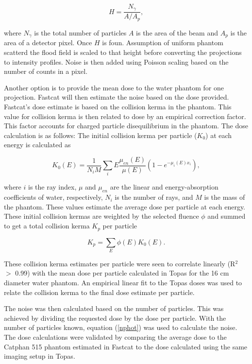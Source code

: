 \begin{equation}
\label{nphot}
    H = \frac{N_\gamma}{A/A_p},
\end{equation}

where $N_\gamma$ is the total number of particles $A$ is the area of the beam and $A_p$ is the area of a detector pixel. Once $H$ is foun.  Assumption of uniform phantom scatterd the flood field is scaled to that height before converting the projections to intensity profiles. Noise is then added using Poisson scaling based on the number of counts in a pixel.  

Another option is to provide the mean dose to the water phantom for one projection. Fastcat will then estimate the noise based on the dose provided. Fastcat's dose estimate is based on the collision kerma in the phantom. This value for collision kerma is then related to dose by an empirical correction factor. This factor accounts for charged particle disequilibrium in the phantom. The dose calculation is as follows: The initial collision kerma per particle ($K_0$) at each energy is calculated as

\begin{equation}
    K_0(E) = \frac{1}{N_i M}\sum\limits_i E \frac{\mu_{en}(E)}{\mu(E)} (1 - e^{-\mu_i(E) x_i}),
\end{equation}

\noindent where $i$ is the ray index, $\mu$ and $\mu_{en}$ are the linear and energy-absorption coefficients of water, respectively, $N_i$ is the number of rays, and $M$ is the mass of the phantom. These values estimate the average dose per particle at each energy. These initial collision kermas are weighted by the selected fluence $\phi$ and summed to get a total collision kerma $K_p$ per particle

\begin{equation}
  K_p = \sum\limits_{E} \phi(E) K_0(E).
\end{equation}

\noindent These collision kerma estimates per particle were seen to correlate linearly (R$^2$ $>$ 0.99) with the mean dose per particle calculated in Topas for the 16 cm diameter water phantom. An empirical linear fit to the Topas doses was used to relate the collision kerma to the final dose estimate per particle. 

The noise was then calculated based on the number of particles. This was achieved by dividing the requested dose by the dose per particle. With the number of particles known, equation (\ref{nphot}) was used to calculate the noise. The dose calculations were validated by comparing the average dose to the Catphan 515 phantom estimated in Fastcat to the dose calculated using the same imaging setup in Topas.

